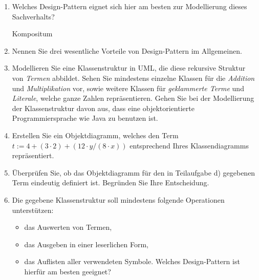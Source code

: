 \documentclass{bschlangaul-aufgabe}
\begin{document}
\begin{enumerate}


\item Welches Design-Pattern eignet sich hier am besten zur Modellierung
dieses Sachverhalts?

\begin{bAntwort}
Kompositum
\end{bAntwort}


\item Nennen Sie drei wesentliche Vorteile von Design-Pattern im
Allgemeinen.


\item Modellieren Sie eine Klassenstruktur in UML, die diese rekursive
Struktur von \emph{Termen} abbildet. Sehen Sie mindestens einzelne
Klassen für die \emph{Addition} und \emph{Multiplikation} vor, sowie
weitere Klassen für \emph{geklammerte Terme} und \emph{Literale}, welche
ganze Zahlen repräsentieren. Gehen Sie bei der Modellierung der
Klassenstruktur davon aus, dass eine objektorientierte
Programmiersprache wie Java zu benutzen ist.


\item Erstellen Sie ein Objektdiagramm, welches den Term $t := 4 + (3
\cdot 2) + (12 \cdot y / (8 \cdot x))$ entsprechend Ihres
Klassendiagramms repräsentiert.


\item Überprüfen Sie, ob das Objektdiagramm für den in Teilaufgabe d)
gegebenen Term eindeutig definiert ist. Begründen Sie Ihre Entscheidung.


\item Die gegebene Klassenstruktur soll mindestens folgende Operationen
unterstützen:

\begin{itemize}
\item das Auswerten von Termen,
\item das Ausgeben in einer leserlichen Form,
\item das Auflisten aller verwendeten Symbole.
Welches Design-Pattern ist hierfür am besten geeignet?

\end{itemize}



\end{enumerate}
\end{document}
